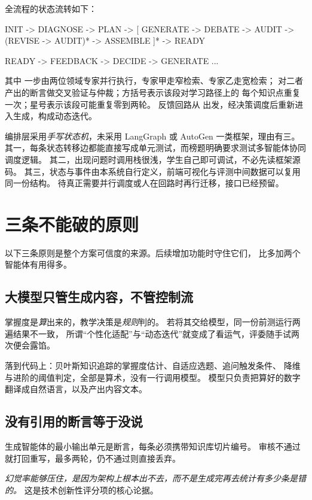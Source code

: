 全流程的状态流转如下：

\begin{code}
INIT -> DIAGNOSE -> PLAN -> [ GENERATE -> DEBATE -> AUDIT
                              -> (REVISE -> AUDIT)* -> ASSEMBLE ]* -> READY

READY -> FEEDBACK -> DECIDE -> GENERATE ...
\end{code}

其中  一步由两位领域专家并行执行，专家甲走窄检索、专家乙走宽检索；
 对二者产出的断言做交叉验证与仲裁；方括号表示该段对学习路径上的
每个知识点重复一次；星号表示该段可能重复零到两轮。
反馈回路从  出发，经决策调度后重新进入生成，构成动态迭代。

编排层采用\emph{手写状态机}，未采用 LangGraph 或 AutoGen 一类框架，理由有三。
其一，每条状态转移边都能直接写成单元测试，而榜题明确要求测试多智能体协同调度逻辑。
其二，出现问题时调用栈很浅，学生自己即可调试，不必先读框架源码。
其三，状态与事件由本系统自行定义，前端可视化与评测中间数据可以复用同一份结构。
待真正需要并行调度或人在回路时再行迁移，接口已经预留。

\section{三条不能破的原则}

以下三条原则是整个方案可信度的来源。后续增加功能时守住它们，
比多加两个智能体有用得多。

\subsection{大模型只管生成内容，不管控制流}

掌握度是\emph{算}出来的，教学决策是\emph{规则}判的。
若将其交给模型，同一份前测运行两遍结果不一致，
所谓“个性化适配”与“动态迭代”就变成了看运气，评委随手试两次便会露馅。

落到代码上：贝叶斯知识追踪的掌握度估计、自适应选题、追问触发条件、
降维与进阶的阈值判定，全部是算术，没有一行调用模型。
模型只负责把算好的数字翻译成自然语言，以及产出内容文本。

\subsection{没有引用的断言等于没说}

生成智能体的最小输出单元是断言，每条必须携带知识库切片编号。
审核不通过就打回重写，最多两轮，仍不通过则直接丢弃。

\emph{幻觉率能够压住，是因为架构上根本出不去，而不是生成完再去统计有多少条是错的。}
这是技术创新性评分项的核心论据。

